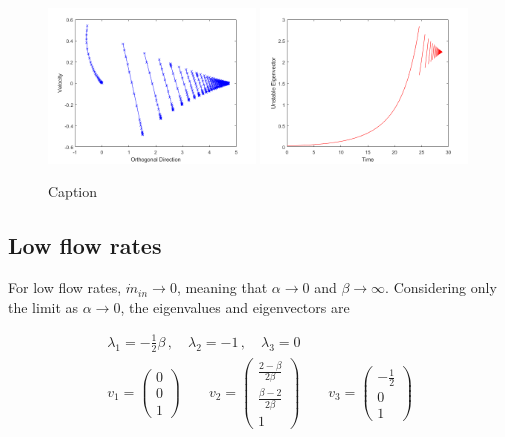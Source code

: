\begin{figure}[!ht]
    \centering
    \includegraphics[width=0.49\textwidth]{Figures/Example/PhasePotrait2D.png}
    \includegraphics[width=0.49\textwidth]{Figures/Example/UnstableEigenvectorTrajectory.png}
    \caption{Caption}
    \label{fig:EigenvectorPhase}
\end{figure}

\newpage
\subsection{Low flow rates}

For low flow rates, $\dot{m}_{in} \rightarrow 0$, meaning that $\alpha \rightarrow 0$ and $\beta \rightarrow \infty$. Considering only the limit as $\alpha \rightarrow 0$, the eigenvalues and eigenvectors are

\begin{equation*}
\begin{split}
    \lambda_1 = - \frac{1}{2}\beta \, , \quad
    \lambda_2 = -1 \, , \quad
    \lambda_3 = 0 \\
    v_1 = \begin{pmatrix}
    0 \\ 0 \\ 1
    \end{pmatrix} \qquad
    v_2 = \begin{pmatrix}
    \frac{2 - \beta}{2\beta} \\ \frac{\beta - 2}{2\beta} \\ 1
    \end{pmatrix} \qquad
    v_3 = \begin{pmatrix}
    - \frac{1}{2} \\ 0 \\ 1
    \end{pmatrix}
\end{split}
\end{equation*}

